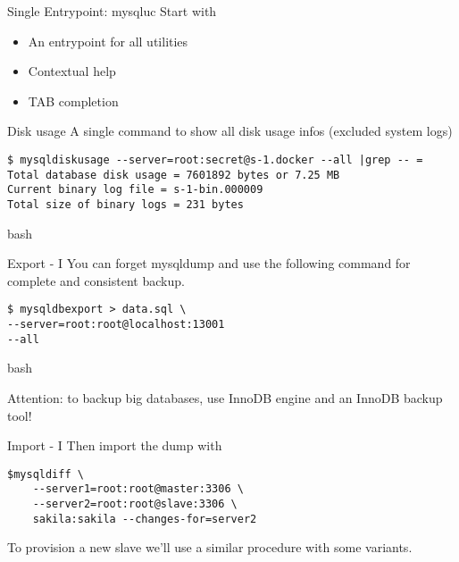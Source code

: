 \documentclass{beamer}[10]
\begin{document}
\begin{pyframe}{Single Entrypoint: mysqluc}
Start with 

\begin{itemize}
\item An entrypoint for all utilities
\item Contextual help
\item TAB completion
\end{itemize}
\end{pyframe}


\iffalse
\begin{pyframe}{Managing binlog}
Managing binlog with \code{mysqlbinlogmove} and
\code{mysqlbinlogpurge}
\end{pyframe}
\fi


\begin{pyframe}{Disk usage}
A single command to show all disk usage infos (excluded system logs)

\begin{verbatim}
$ mysqldiskusage --server=root:secret@s-1.docker --all |grep -- =
Total database disk usage = 7601892 bytes or 7.25 MB
Current binary log file = s-1-bin.000009
Total size of binary logs = 231 bytes
\end{verbatim}{bash}

\end{pyframe}

%
%
\begin{pyframe}{Export - I}
You can forget mysqldump and use the following
command for complete and consistent backup.
\begin{verbatim}
$ mysqldbexport > data.sql \
--server=root:root@localhost:13001
--all
\end{verbatim}{bash}

Attention: to backup big databases, use InnoDB engine
and an InnoDB backup tool!
\end{pyframe}


\begin{pyframe}{Import - I}
Then import the dump with
\begin{verbatim}
$mysqldiff \
    --server1=root:root@master:3306 \
    --server2=root:root@slave:3306 \
    sakila:sakila --changes-for=server2
\end{verbatim}
To provision a new slave we'll use a similar
procedure with some variants.
\end{pyframe}
\end{document}
